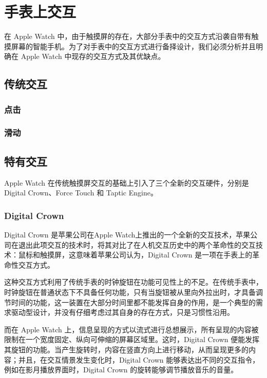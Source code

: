 \chapter{手表上交互}

\quad\quad 在 Apple Watch 中，由于触摸屏的存在，大部分手表中的交互方式沿袭自带有触摸屏幕的智能手机\cite{WatchGuidelines:2016}。为了对手表中的交互方式进行备择设计，我们必须分析并且明确在 Apple Watch 中现存的交互方式及其优缺点。

\section{传统交互}

\subsection{点击}

\subsection{滑动}

\section{特有交互}

Apple Watch 在传统触摸屏交互的基础上引入了三个全新的交互硬件，分别是Digital Crown、Force Touch 和 Taptic Engine。

\subsection{Digital Crown}

Digital Crown 是苹果公司在Apple Watch上推出的一个全新的交互技术，苹果公司在退出此项交互的技术时，将其对比了在人机交互历史中的两个革命性的交互技术：鼠标和触摸屏，这意味着苹果公司认为，Digital Crown 是一项在手表上的革命性交互方式。

这种交互方式利用了传统手表的时钟旋钮在功能可见性上的不足。在传统手表中，时钟旋钮在普通状态下不具备任何功能，只有当旋钮被从里向外拉出时，才具备调节时间的功能，这一装置在大部分时间里都不能发挥自身的作用，是一个典型的需求驱动型设计，并没有仔细考虑过其自身的存在方式，只是习惯性沿用。

而在 Apple Watch 上，信息呈现的方式以流式进行总想展示，所有呈现的内容被限制在一个宽度固定、纵向可伸缩的屏幕区域里。这时，Digital Crown 便能发挥其旋钮的功能。当产生旋转时，内容在竖直方向上进行移动，从而呈现更多的内容；并且，在交互情景发生变化时，Digital Crown 能够表达出不同的交互指令，例如在影月播放界面时，Digital Crown 的旋转能够调节播放音乐的音量。

